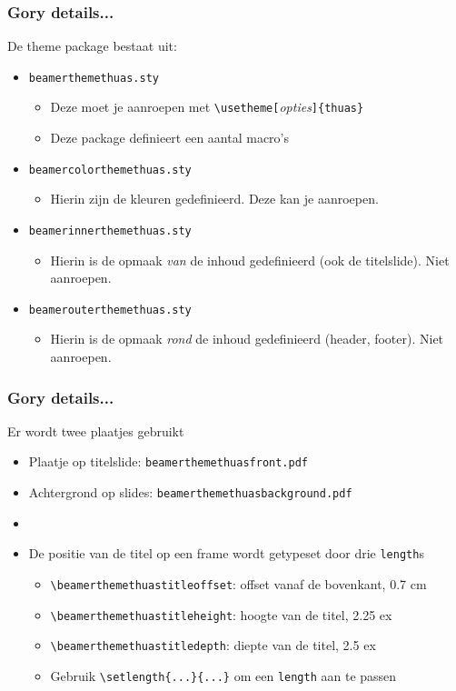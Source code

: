 \documentclass[fleqn,aspectratio=169,dutch,10pt]{beamer}
\begin{document}
\begin{frame}[fragile]
\frametitle{Gory details...}
De theme package bestaat uit:
\begin{itemize}
\item \texttt{beamerthemethuas.sty}
\begin{itemize}
\item Deze moet je aanroepen met \lstinline|\usetheme[|\textsl{opties}\lstinline|]{thuas}|
\item Deze package definieert een aantal macro's
\end{itemize}
\item \texttt{beamercolorthemethuas.sty}
\begin{itemize}
\item Hierin zijn de kleuren gedefinieerd. Deze kan je aanroepen.
\end{itemize}
\item \texttt{beamerinnerthemethuas.sty}
\begin{itemize}
\item Hierin is de opmaak \emph{van} de inhoud gedefinieerd (ook de titelslide). Niet aanroepen.
\end{itemize}
\item \texttt{beamerouterthemethuas.sty}
\begin{itemize}
\item Hierin is de opmaak \emph{rond} de inhoud gedefinieerd (header, footer). Niet aanroepen.
\end{itemize}
\end{itemize}
\end{frame}


\begin{frame}[fragile]
\frametitle{Gory details...}
Er wordt twee plaatjes gebruikt
\begin{itemize}
\item Plaatje op titelslide: \lstinline|beamerthemethuasfront.pdf|
\item Achtergrond op slides: \lstinline|beamerthemethuasbackground.pdf|
\item []
\item De positie van de titel op een frame wordt getypeset door drie \lstinline|length|s
\begin{itemize}
\item \lstinline|\beamerthemethuastitleoffset|: offset vanaf de bovenkant, 0.7 cm
\item \lstinline|\beamerthemethuastitleheight|: hoogte van de titel, 2.25 ex
\item \lstinline|\beamerthemethuastitledepth|: diepte van de titel, 2.5 ex
\item Gebruik \lstinline|\setlength{...}{...}| om een \lstinline|length| aan te passen
\end{itemize}
\end{itemize}
\end{frame}
\end{document}
